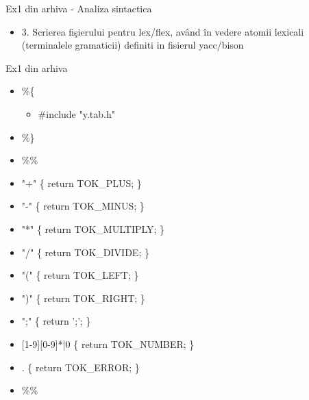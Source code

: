 \documentclass[pdf]{beamer}
\begin{document}
\begin{frame}{Ex1 din arhiva - Analiza sintactica}
\begin{itemize}
	\item
	3. Scrierea fişierului pentru lex/flex, având în vedere atomii lexicali (terminalele gramaticii) definiti in fisierul yacc/bison

\end{itemize}
\end{frame}



\begin{frame}{Ex1 din arhiva}
\begin{itemize}
	\item[]
	\%\{
		
		\begin{itemize}
			\item[]
					\#include "y.tab.h"
		\end{itemize}

	\item[]
	\%\}

	\item[]
	\%\%

	\item[]
	"+" \hspace{1.55cm} \{ return TOK\_PLUS; \}

	\item[]
	"-" \hspace{1.7cm} \{ return TOK\_MINUS; \}

	\item[]
	"*" \hspace{1.65cm} \{ return TOK\_MULTIPLY; \}

	\item[]
	"/" \hspace{1.65cm} \{ return TOK\_DIVIDE; \}

	\item[]
	"(" \hspace{1.65cm} \{ return TOK\_LEFT; \}

	\item[]
	")" \hspace{1.65cm} \{ return TOK\_RIGHT; \}

	\item[]
	";" \hspace{1.7cm} \{ return ';'; \}

	\item[]
	{[1-9][0-9]}*|0 \hspace{0.25cm} \{ return TOK\_NUMBER; \}

	\item[]
	. \hspace{2cm} \{ return TOK\_ERROR; \}

	\item[]
	\%\%

\end{itemize}
\end{frame}
\end{document}
